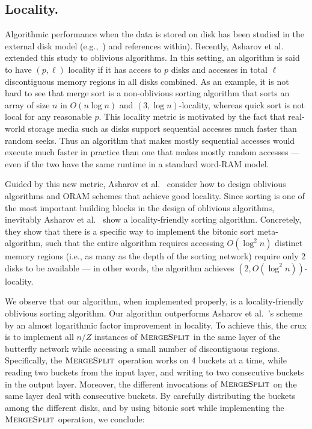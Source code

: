 \subsection{Locality.}
\label{sec:locality}
Algorithmic performance when the data is stored on disk has been studied in the external disk model (e.g.,~\cite{RuemmlerW94,ArgeFGV97,Vitter01,Vitter06}) and references within). Recently, Asharov et al.~\cite{AsharovCNPRS19} extended this study to oblivious algorithms. In this setting, an algorithm 
is said to have $(p, \ell)$ locality if it has access 
to $p$ disks and 
accesses in total $\ell$ discontiguous memory regions in all disks combined. As an example, it is not hard to see that merge sort is a non-oblivious sorting algorithm that sorts an array of size $n$ in $O(n \log n)$ and $(3,\log n)$-locality, whereas quick sort  is not local for any reasonable $p$. 
This locality metric is motivated by the fact that real-world storage
media such as disks support sequential accesses
much faster than random seeks. Thus an algorithm that 
makes mostly sequential accesses would execute much faster in practice than one that  
makes mostly random accesses --- even if the two have the same runtime in a standard
word-RAM model. 

Guided by this new metric, Asharov et al.~\cite{AsharovCNPRS19} consider how to design oblivious algorithms and ORAM schemes that achieve good locality. 
Since sorting is one of the most important
building blocks in the 
design of oblivious algorithms, 
inevitably Asharov et al.~\cite{AsharovCNPRS19}
show a locality-friendly sorting algorithm.
Concretely, they show that there is a specific way to implement
the bitonic sort meta-algorithm,
such that the entire algorithm requires accessing 
$O(\log^2 n)$ distinct memory regions (i.e., as many as the depth of the sorting network) 
require only 2 disks to be available --- in other words,
the algorithm achieves $(2, O(\log^2 n))$-locality.

We observe that our algorithm, when implemented properly, is a locality-friendly oblivious sorting algorithm. 
Our algorithm 
outperforms Asharov et al.~\cite{AsharovCNPRS19}'s  scheme 
by an almost logarithmic 
factor improvement in locality. %
To achieve this, the crux is to implement all $n/Z$ instances of 
$\textsc{MergeSplit}$ in the same layer of the butterfly network 
while accessing a small number of discontiguous regions. Specifically, the $\textsc{MergeSplit}$ operation works on 4 buckets at a time, while reading two buckets from the input layer, and writing to two consecutive buckets in the output layer. Moreover, the different invocations of $\textsc{MergeSplit}$ on the same layer deal with consecutive buckets. By carefully distributing the buckets among the different disks, and by using bitonic sort while implementing the $\textsc{MergeSplit}$ operation, we conclude:

